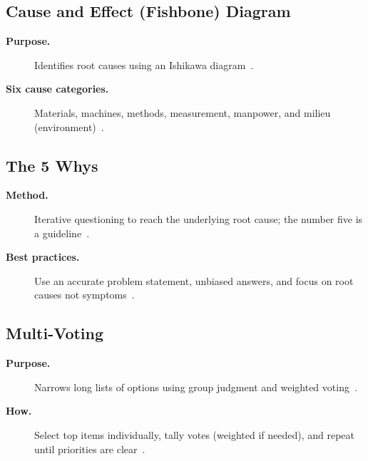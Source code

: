 \documentclass[../main.tex]{subfiles}
\begin{document}
\subsection{Cause and Effect (Fishbone) Diagram}
\begin{description}
  \item[\textbf{Purpose.}] Identifies root causes using an Ishikawa diagram~\autocite{edo-3-3-6-risk-management-problem-solving-2025}.
  \item[\textbf{Six cause categories.}] Materials, machines, methods, measurement, manpower, and milieu (environment)~\autocite{edo-3-3-6-risk-management-problem-solving-2025}.
\end{description}

\subsection{The 5 Whys}
\begin{description}
  \item[\textbf{Method.}] Iterative questioning to reach the underlying root cause; the number five is a guideline~\autocite{edo-3-3-6-risk-management-problem-solving-2025}.
  \item[\textbf{Best practices.}] Use an accurate problem statement, unbiased answers, and focus on root causes not symptoms~\autocite{edo-3-3-6-risk-management-problem-solving-2025}.
\end{description}

\subsection{Multi-Voting}
\begin{description}
  \item[\textbf{Purpose.}] Narrows long lists of options using group judgment and weighted voting~\autocite{edo-3-3-6-risk-management-problem-solving-2025}.
  \item[\textbf{How.}] Select top items individually, tally votes (weighted if needed), and repeat until priorities are clear~\autocite{edo-3-3-6-risk-management-problem-solving-2025}.
\end{description}
\end{document}
